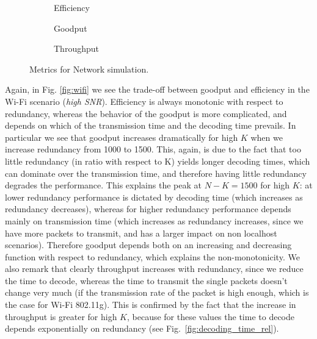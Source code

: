 \begin{figure}[!hp]
\centering
\begin{subfigure}{0.23\textwidth}
	\captionsetup{justification=centering,font=scriptsize}
	\centering
	\setlength\fwidth{\textwidth}
	\setlength{}
	
	\caption{Efficiency}
	\label{fig:net_eff}
\end{subfigure}\hspace{2em}%
\begin{subfigure}{0.23\textwidth}
	\captionsetup{justification=centering,font=scriptsize}
	\centering
	\setlength\fwidth{\textwidth}
	\setlength{}
	
	\caption{Goodput}
	\label{fig:net_good}
\end{subfigure}\hspace{2em}%
\begin{subfigure}{0.23\textwidth}
	\captionsetup{justification=centering,font=scriptsize}
	\centering
	\setlength\fwidth{\textwidth}
	\setlength{}
	
	\caption{Throughput}
	\label{fig:net_thr}
\end{subfigure}
\caption{Metrics for Network simulation.}
\label{fig:net}
\end{figure}

Again, in Fig. \ref{fig:wifi} we see the trade-off between goodput and efficiency in the Wi-Fi scenario (\textit{high SNR}). Efficiency is always monotonic with respect to redundancy, whereas the behavior of the goodput is more complicated, and depends on which of the transmission time and the decoding time prevails. In particular we see that goodput increases dramatically for high $K$ when we increase redundancy from 1000 to 1500. This, again, is due to the fact that too little redundancy (in ratio with respect to K) yields longer decoding times, which can dominate over the transmission time, and therefore having little redundancy degrades the performance. This explains the peak at $N-K=1500$ for high $K$: at lower redundancy performance is dictated by decoding time (which increases as redundancy decreases), whereas for higher redundancy performance depends mainly on transmission time (which increases as redundancy increases, since we have more packets to transmit, and has a larger impact on non localhost scenarios). Therefore goodput depends both on an increasing and decreasing function with respect to redundancy, which explains the non-monotonicity.  We also remark that clearly throughput increases with redundancy, since we reduce the time to decode, whereas the time to transmit the single packets doesn't change very much (if the transmission rate of the packet is high enough, which is the case for Wi-Fi 802.11g). This is confirmed by the fact that the increase in throughput is greater for high $K$, because for these values the time to decode depends exponentially on redundancy (see Fig.~\ref{fig:decoding_time_rel}). 


